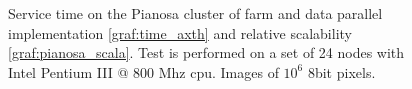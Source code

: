 \begin{figure}[p]
\centering
{}
\caption{ Service time on the Pianosa cluster of farm and data parallel implementation \ref{graf:time_axth} and relative scalability \ref{graf:pianosa_scala}.  Test is performed on a set of 24 nodes with Intel Pentium III @ 800 Mhz cpu. Images of $10^6$ 8bit pixels.}
\label{chart:pianosa_comm}
\end{figure}
